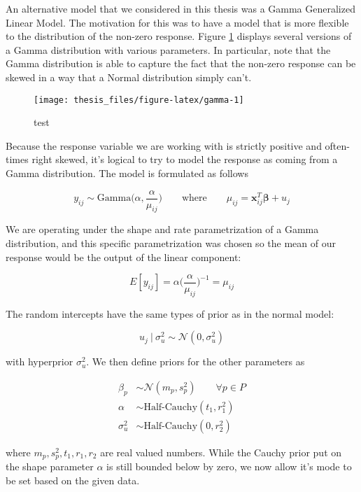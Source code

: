 \documentclass[12pt,twoside]{reedthesis}
\begin{document}
An alternative model that we considered in this thesis was a Gamma Generalized Linear Model. The motivation for this was to have a model that is more flexible to the distribution of the non-zero response. Figure \ref{fig:gamma} displays several versions of a Gamma distribution with various parameters. In particular, note that the Gamma distribution is able to capture the fact that the non-zero response can be skewed in a way that a Normal distribution simply can't.
\begin{figure}

{\centering \texttt{[image: thesis\_files/figure-latex/gamma-1]} 

}

\caption{test}\label{fig:gamma}
\end{figure}
Because the response variable we are working with is strictly positive and often-times right skewed, it's logical to try to model the response as coming from a Gamma distribution. The model is formulated as follows

\[
y_{ij} \sim \text{Gamma}\bigg(\alpha, \frac{\alpha}{\mu_{ij}}\bigg) \qquad \text{where} \qquad \mu_{ij} = \mathbf{x}_{ij}^T\boldsymbol{\beta} + u_j
\]

We are operating under the shape and rate parametrization of a Gamma distribution, and this specific parametrization was chosen so the mean of our response would be the output of the linear component:

\[
E[y_{ij}] = \alpha \bigg(\frac{\alpha}{\mu_{ij}}\bigg)^{-1} = \mu_{ij}
\]

The random intercepts have the same types of prior as in the normal model:

\[
u_j \ | \ \sigma_{u}^2 \sim \mathcal{N}(0, \sigma_{u}^2)
\]

with hyperprior \(\sigma_{u}^2\). We then define priors for the other parameters as

\[
\begin{aligned}
\beta_p &\sim \mathcal{N}(m_p, s_p^2)  \qquad \forall p\in P \\
\alpha &\sim \text{Half-Cauchy}(t_1, r_1^2)\\
\sigma_{u}^2 &\sim \text{Half-Cauchy}(0, r_2^2)
\end{aligned}
\]

where \(m_p, s_p^2, t_1, r_1, r_2\) are real valued numbers. While the Cauchy prior put on the shape parameter \(\alpha\) is still bounded below by zero, we now allow it's mode to be set based on the given data.
\end{document}
